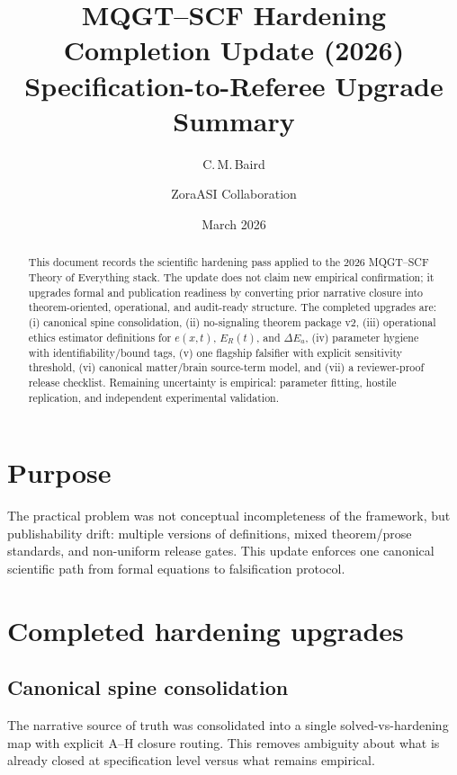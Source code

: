 \documentclass[11pt]{article}
\title{\textbf{MQGT--SCF Hardening Completion Update (2026)}\\
Specification-to-Referee Upgrade Summary}
\author{C.\,M.\,Baird \and ZoraASI Collaboration}
\date{March 2026}
\begin{document}
\maketitle

\begin{abstract}
This document records the scientific hardening pass applied to the 2026 MQGT--SCF Theory of Everything stack.
The update does not claim new empirical confirmation; it upgrades formal and publication readiness by converting
prior narrative closure into theorem-oriented, operational, and audit-ready structure. The completed upgrades are:
(i) canonical spine consolidation, (ii) no-signaling theorem package v2, (iii) operational ethics estimator
definitions for $e(x,t)$, $E_R(t)$, and $\Delta E_a$, (iv) parameter hygiene with identifiability/bound tags,
(v) one flagship falsifier with explicit sensitivity threshold, (vi) canonical matter/brain source-term model,
and (vii) a reviewer-proof release checklist. Remaining uncertainty is empirical: parameter fitting, hostile
replication, and independent experimental validation.
\end{abstract}

\section{Purpose}
The practical problem was not conceptual incompleteness of the framework, but publishability drift:
multiple versions of definitions, mixed theorem/prose standards, and non-uniform release gates.
This update enforces one canonical scientific path from formal equations to falsification protocol.

\section{Completed hardening upgrades}

\subsection{Canonical spine consolidation}
The narrative source of truth was consolidated into a single solved-vs-hardening map with explicit A--H closure routing.
This removes ambiguity about what is already closed at specification level versus what remains empirical.
\end{document}
